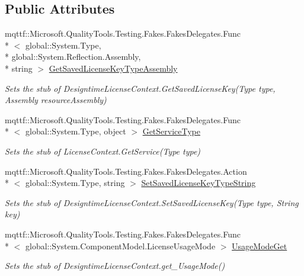 \subsection*{Public Attributes}
\begin{DoxyCompactItemize}
\item 
mqttf\-::\-Microsoft.\-Quality\-Tools.\-Testing.\-Fakes.\-Fakes\-Delegates.\-Func\\*
$<$ global\-::\-System.\-Type, \\*
global\-::\-System.\-Reflection.\-Assembly, \\*
string $>$ \hyperlink{class_system_1_1_component_model_1_1_design_1_1_fakes_1_1_stub_designtime_license_context_a087e99e55fd9f1c7cd6ee9b8bbcc20f7}{Get\-Saved\-License\-Key\-Type\-Assembly}
\begin{DoxyCompactList}\small\item\em Sets the stub of Designtime\-License\-Context.\-Get\-Saved\-License\-Key(\-Type type, Assembly resource\-Assembly)\end{DoxyCompactList}\item 
mqttf\-::\-Microsoft.\-Quality\-Tools.\-Testing.\-Fakes.\-Fakes\-Delegates.\-Func\\*
$<$ global\-::\-System.\-Type, object $>$ \hyperlink{class_system_1_1_component_model_1_1_design_1_1_fakes_1_1_stub_designtime_license_context_a23e646a8d81d2dbc7c11bd9eba35f238}{Get\-Service\-Type}
\begin{DoxyCompactList}\small\item\em Sets the stub of License\-Context.\-Get\-Service(\-Type type)\end{DoxyCompactList}\item 
mqttf\-::\-Microsoft.\-Quality\-Tools.\-Testing.\-Fakes.\-Fakes\-Delegates.\-Action\\*
$<$ global\-::\-System.\-Type, string $>$ \hyperlink{class_system_1_1_component_model_1_1_design_1_1_fakes_1_1_stub_designtime_license_context_a5409e3fbe953820204efb0ff43fd4a55}{Set\-Saved\-License\-Key\-Type\-String}
\begin{DoxyCompactList}\small\item\em Sets the stub of Designtime\-License\-Context.\-Set\-Saved\-License\-Key(\-Type type, String key)\end{DoxyCompactList}\item 
mqttf\-::\-Microsoft.\-Quality\-Tools.\-Testing.\-Fakes.\-Fakes\-Delegates.\-Func\\*
$<$ global\-::\-System.\-Component\-Model.\-License\-Usage\-Mode $>$ \hyperlink{class_system_1_1_component_model_1_1_design_1_1_fakes_1_1_stub_designtime_license_context_a47bfbc122b13f313d9f43122c4f3a514}{Usage\-Mode\-Get}
\begin{DoxyCompactList}\small\item\em Sets the stub of Designtime\-License\-Context.\-get\-\_\-\-Usage\-Mode()\end{DoxyCompactList}\end{DoxyCompactItemize}
